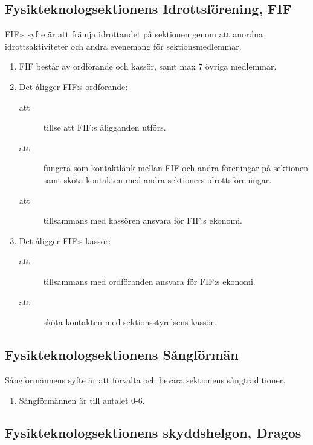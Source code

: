 \documentclass[11pt,a4paper]{article}
\begin{document}
\subsection{Fysikteknologsektionens Idrottsförening, FIF}
FIF:s syfte är att främja idrottandet på sektionen genom att anordna idrottsaktiviteter och andra evenemang för sektionsmedlemmar.
\begin{enumerate}[\thesubsection .1]

  \item FIF består av ordförande och kassör, samt max 7 övriga
  medlemmar.

  \item Det åligger FIF:s ordförande:
    \begin{description}
      \item[att] tillse att FIF:s åligganden utförs.
      \item[att] fungera som kontaktlänk mellan FIF och andra
      föreningar på sektionen samt sköta kontakten med andra
      sektioners idrotts\-före\-ning\-ar.
      \item[att] tillsammans med kassören ansvara för FIF:s ekonomi.
    \end{description}

  \item Det åligger FIF:s kassör:
    \begin{description}
      \item[att] tillsammans med ordföranden ansvara för FIF:s ekonomi.
      \item[att] sköta kontakten med sektionsstyrelsens kassör.
    \end{description}

\end{enumerate}

\subsection{Fysikteknologsektionens Sångförmän}
Sångförmännens syfte är att förvalta och bevara sektionens sångtraditioner.
\begin{enumerate}[\thesubsection .1]

  \item Sångförmännen är till antalet 0-6.

\end{enumerate}



\subsection{Fysikteknologsektionens skyddshelgon, Dragos}
\end{document}
